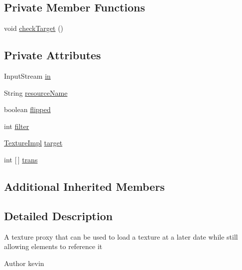 \subsection*{Private Member Functions}
\begin{DoxyCompactItemize}
\item 
void \mbox{\hyperlink{classorg_1_1newdawn_1_1slick_1_1opengl_1_1_deferred_texture_a22f14bcd9cbd4bf033e2308b90464dce}{check\+Target}} ()
\end{DoxyCompactItemize}
\subsection*{Private Attributes}
\begin{DoxyCompactItemize}
\item 
Input\+Stream \mbox{\hyperlink{classorg_1_1newdawn_1_1slick_1_1opengl_1_1_deferred_texture_a489ed93637c4777d8f36d17233a77d59}{in}}
\item 
String \mbox{\hyperlink{classorg_1_1newdawn_1_1slick_1_1opengl_1_1_deferred_texture_a883fc20f133626f8f49684adb5b65976}{resource\+Name}}
\item 
boolean \mbox{\hyperlink{classorg_1_1newdawn_1_1slick_1_1opengl_1_1_deferred_texture_a1dcb7e5cee99769047c984f3fe8f7a8f}{flipped}}
\item 
int \mbox{\hyperlink{classorg_1_1newdawn_1_1slick_1_1opengl_1_1_deferred_texture_abb572d47ae7bce7204cc9c86245c9797}{filter}}
\item 
\mbox{\hyperlink{classorg_1_1newdawn_1_1slick_1_1opengl_1_1_texture_impl}{Texture\+Impl}} \mbox{\hyperlink{classorg_1_1newdawn_1_1slick_1_1opengl_1_1_deferred_texture_aa70a4b195d0b965a0099d0e7bc18d9d2}{target}}
\item 
int \mbox{[}$\,$\mbox{]} \mbox{\hyperlink{classorg_1_1newdawn_1_1slick_1_1opengl_1_1_deferred_texture_a8dc1083c72d7039e412c71e1cd75d4e6}{trans}}
\end{DoxyCompactItemize}
\subsection*{Additional Inherited Members}


\subsection{Detailed Description}
A texture proxy that can be used to load a texture at a later date while still allowing elements to reference it

\begin{DoxyAuthor}{Author}
kevin 
\end{DoxyAuthor}


